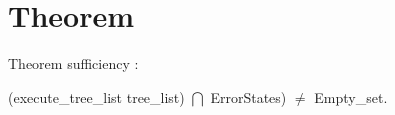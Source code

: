 \section{Theorem}
\begin{thm}
Theorem sufficiency : 

(execute\_tree\_list tree\_list) $\bigcap$ ErrorStates)
$\neq$ Empty\_set.
\end{thm}
%
%
%
%
%
%
%
%
%
